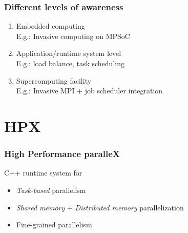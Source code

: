 \documentclass[compress]{beamer}
\begin{document}
\begin{frame}
	\frametitle{Different levels of awareness}
	\begin{enumerate}
		\item Embedded computing\\
			E.g.: Invasive computing on MPSoC
		\vspace{3mm}
		\pause
		\item Application/runtime system level\\
			E.g.: load balance, task scheduling
		\vspace{3mm}
		\pause
		\item Supercomputing facility\\
			E.g.: Invasive MPI + job scheduler integration
	\end{enumerate}
\end{frame}

\section{HPX}
\begin{frame}
	\frametitle{High Performance paralleX}
	\pause
	C++ runtime system for
	\vspace{3mm}
	\begin{itemize}
		\item \emph{Task-based} parallelism
		\item \emph{Shared memory} + \emph{Distributed memory} parallelization
		\item Fine-grained parallelism
	\end{itemize}
\end{frame}
\end{document}
